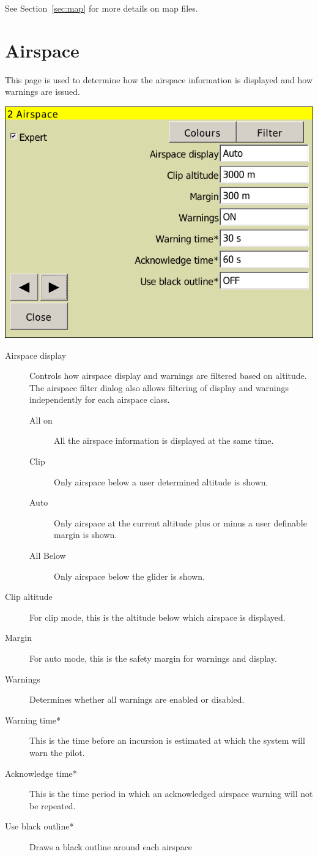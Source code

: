 \documentclass[a4paper,12pt]{refrep}
\begin{document}
See Section~\ref{sec:map} for more details on map files.


\clearpage
\section{Airspace}

This page is used to determine how the airspace information is
displayed and how warnings are issued.

\begin{center}
\includegraphics[angle=0,width=0.8\linewidth,keepaspectratio='true']{figures/config-airspace.png}
\end{center}

\begin{description}
\item[Airspace display] Controls how airspace display and warnings are filtered based on altitude.  The airspace filter dialog also allows filtering
 of display and warnings independently for each airspace class.
\begin{description}
\item[All on] All the airspace information is displayed at the same time.
\item[Clip] Only airspace below a user determined altitude is shown.
\item[Auto] Only airspace at the current altitude plus or minus a user definable margin is shown.
\item[All Below]  Only airspace below the glider is shown.
\end{description}
\item[Clip altitude] For clip mode, this is the altitude below which airspace is displayed.
\item[Margin] For auto mode, this is the safety margin for warnings and display.
\item[Warnings] Determines whether all warnings are enabled or disabled.
\item[Warning time*]  This is the time before an incursion is estimated at
  which the system will warn the pilot.
\item[Acknowledge time*]  This is the time period in which an acknowledged airspace warning will not be repeated.
\item[Use black outline*] Draws a black outline around each airspace
\end{description}
\end{document}
